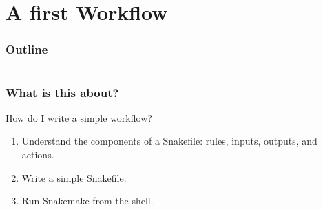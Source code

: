 \section{A first Workflow}

\begin{frame}
    \frametitle{Outline}
    \begin{columns}[t]
        \begin{column}{.5\textwidth}
            \tableofcontents[sections={1-7},currentsection]
        \end{column}
        \begin{column}{.5\textwidth}
            \tableofcontents[sections={8-15},currentsection]
        \end{column}
    \end{columns}
\end{frame}

\begin{frame}
  \frametitle{What is this about?}
   \begin{question}[Questions]
   	 How do I write a simple workflow?
   \end{question}
   \begin{docs}[Objectives]
   	 \begin{enumerate}
                      \item Understand the components of a Snakefile: rules, inputs, outputs, and actions.
                      \item Write a simple Snakefile.
                      \item Run Snakemake from the shell.
     \end{enumerate}
   \end{docs}
\end{frame}

